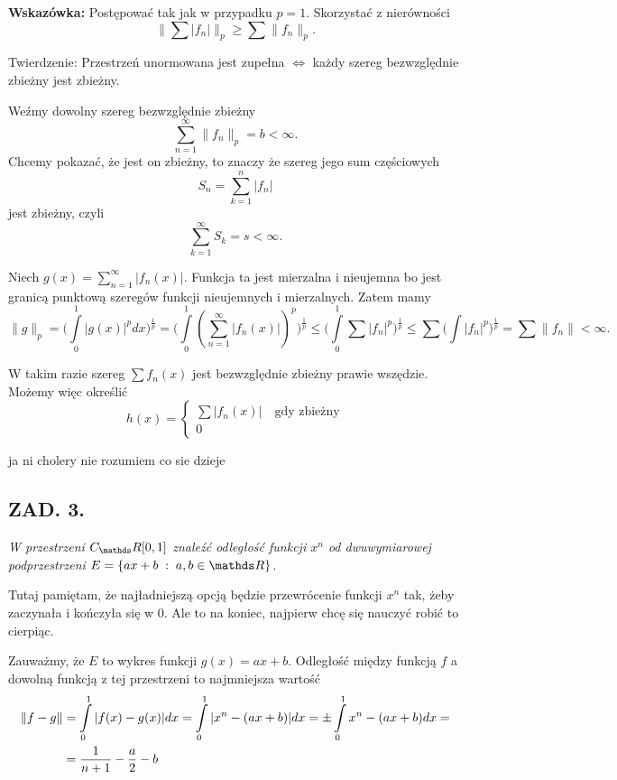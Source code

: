 \documentclass{article}
\begin{document}
\textbf{Wskazówka:} Postępować tak jak w przypadku $p=1$. Skorzystać z nierówności
$$\|\sum|f_n|\|_p\geq\sum\|f_n\|_p.$$

\medskip

{\color{def}Twierdzenie}: Przestrzeń unormowana jest zupełna $\iff$ każdy szereg bezwzględnie zbieżny jest zbieżny.
\medskip

Weźmy dowolny szereg bezwzględnie zbieżny
$$\sum\limits_{n=1}^\infty\|f_n\|_p=b<\infty.$$
Chcemy pokazać, że jest on zbieżny, to znaczy że szereg jego sum częściowych
$$S_n=\sum\limits_{k=1}^n |f_n|$$
jest zbieżny, czyli
$$\sum\limits_{k=1}^\infty S_k=s<\infty.$$

Niech $g(x)=\sum\limits_{n=1}^\infty|f_n(x)|$. Funkcja ta jest mierzalna i nieujemna bo jest granicą punktową szeregów funkcji nieujemnych i mierzalnych. Zatem mamy
$$\|g\|_p=\Big(\int\limits_0^1|g(x)|^pdx\Big)^{\frac1p}=\Big(\int\limits_0^1(\sum\limits_{n=1}^\infty|f_n(x)|)^p\Big)^\frac1p\leq \Big(\int\limits_0^1\sum|f_n|^p\Big)^\frac1p\leq\sum\Big(\int|f_n|^p\Big)^\frac1p=\sum\|f_n\|<\infty.$$

W takim razie szereg $\sum f_n(x)$ jest bezwzględnie zbieżny prawie wszędzie. Możemy więc określić
$$h(x)=\begin{cases}\sum|f_n(x)|\quad \text{gdy zbieżny}\\
0\end{cases}$$

{\color{cyan}ja ni cholery nie rozumiem co sie dzieje}

\subsection*{ZAD. 3.}
\emph{W przestrzeni $C_\R[0,1]$ znaleźć odległość funkcji $x^n$ od dwuwymiarowej podprzestrzeni $E=\{ax+b\;:\;a,b\in\R\}$.}
\medskip

Tutaj pamiętam, że najładniejszą opcją będzie przewrócenie funkcji $x^n$ tak, żeby zaczynała i kończyła się w 0. Ale to na koniec, najpierw chcę się nauczyć robić to cierpiąc.
\medskip

Zauważmy, że $E$ to wykres funkcji $g(x)=ax+b$. Odległość między funkcją $f$ a dowolną funkcją z tej przestrzeni to najmniejsza wartość
\begin{align*}
    \|f-g\|&=\int\limits_0^1|f(x)-g(x)|dx=\int\limits_0^1|x^n-(ax+b)|dx=\pm\int\limits_0^1x^n-(ax+b)dx=\\
    &={1\over n+1}-{a\over2}-b
\end{align*}
\end{document}

